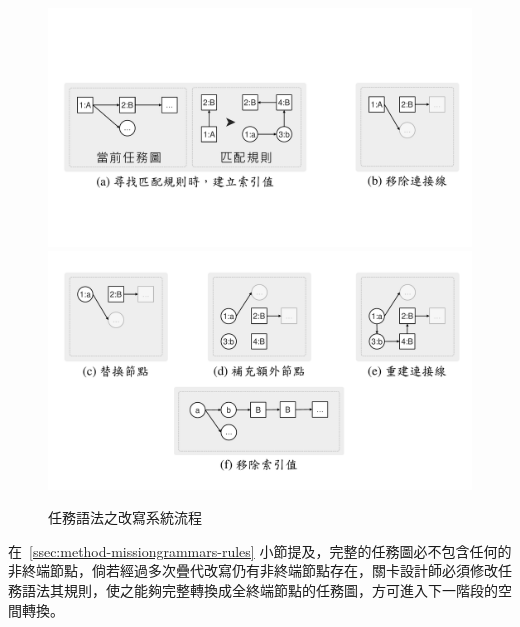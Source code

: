 \begin{figure}[!htb]
  \begin{center}
    \includegraphics[width=1.0\textwidth]{figures/rewrite-system-i-flow.pdf}
    \includegraphics[width=1.0\textwidth]{figures/rewrite-system-i-flow-.pdf}
    \caption{任務語法之改寫系統流程}
    \label{fig:rewrite-system-i-flow}
  \end{center}
\end{figure}

在~\ref{ssec:method-missiongrammars-rules} 小節提及，完整的任務圖必不包含任何的非終端節點，倘若經過多次疊代改寫仍有非終端節點存在，關卡設計師必須修改任務語法其規則，使之能夠完整轉換成全終端節點的任務圖，方可進入下一階段的空間轉換。


